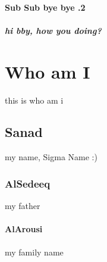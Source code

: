 \documentclass[a4paper,12pt]{book}
\begin{document}
	\subsubsection{Sub Sub bye bye .2}
	\paragraph{
	hi bby, how you doing?
	}
	
	
	\chapter{Who am I}
	this is who am i
	
	\section{Sanad}
	my name, Sigma Name :)
	\subsection{AlSedeeq}
	my father
	\subsubsection{AlArousi}
	my family name
\end{document}
